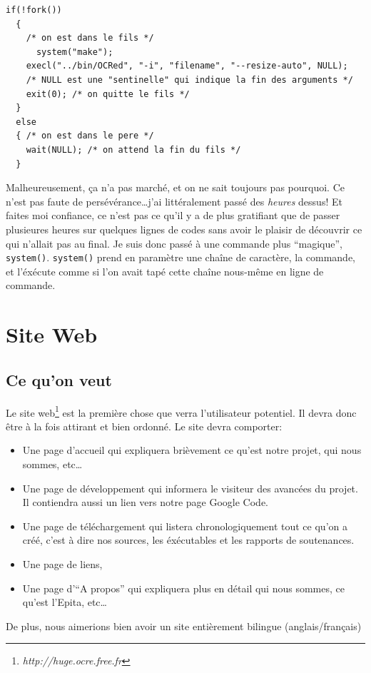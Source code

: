 \documentclass[a4paper,12pt]{report}
\newcommand{\url}[1]{\emph{#1}}
\begin{document}
\begin{lstlisting}
if(!fork())   
  {
    /* on est dans le fils */
      system("make");  
    execl("../bin/OCRed", "-i", "filename", "--resize-auto", NULL);
    /* NULL est une "sentinelle" qui indique la fin des arguments */
    exit(0); /* on quitte le fils */
  }
  else
  { /* on est dans le pere */
    wait(NULL); /* on attend la fin du fils */
  }
\end{lstlisting}

Malheureusement, \c ca n'a pas march\'e, et on ne sait toujours pas pourquoi. Ce n'est pas faute de pers\'ev\'erance\ldots j'ai litt\'eralement pass\'e des \emph{heures} dessus! Et faites moi confiance, ce n'est pas ce qu'il y a de plus gratifiant que de passer plusieures heures sur quelques lignes de codes sans avoir le plaisir de d\'ecouvrir ce qui n'allait pas au final. Je suis donc pass\'e \`a une commande plus ``magique'', \verb!system()!. \verb!system()! prend en param\`etre une cha\^ine de caract\`ere, la commande, et l'\'ex\'ecute comme si l'on avait tap\'e cette cha\^ine nous-m\^eme en ligne de commande.

\chapter{Site Web} %
\label{cha:site_web}
	\section{Ce qu'on veut} %
	\label{sec:ce_qu_on_veut}
	Le site web\footnote{\url{http://huge.ocre.free.fr}} est la premi\`ere chose que verra l'utilisateur potentiel. Il devra donc \^etre \`a la fois attirant et bien ordonn\'e. Le site devra comporter:
	\begin{itemize}
		\item Une page d'accueil qui expliquera bri\`evement ce qu'est notre projet, qui nous sommes, etc\ldots
		\item Une page de d\'eveloppement qui informera le visiteur des avanc\'ees du projet. Il contiendra aussi un lien vers notre page Google Code.
		\item Une page de t\'el\'echargement qui listera chronologiquement tout ce qu'on a cr\'e\'e, c'est \`a dire nos sources, les \'ex\'ecutables et les rapports de soutenances.
		\item Une page de liens,
		\item Une page d'``A propos'' qui expliquera plus en d\'etail qui nous sommes, ce qu'est l'Epita, etc\ldots
	\end{itemize}
	De plus, nous aimerions bien avoir un site enti\`erement bilingue (anglais/fran\c cais)
	
\end{document}
